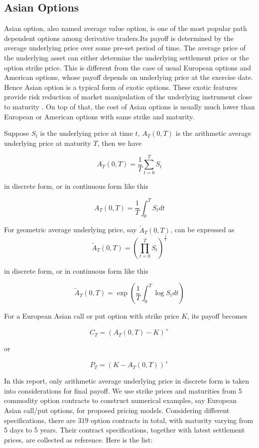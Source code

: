 \documentclass[10pt, a4paper, twocolumn]{article} %
\begin{document}
\subsection{Asian Options}

Asian option, also named average value option, is one of the most popular path dependent options among derivative traders.Its payoff is determined by the average underlying price over some pre-set period of time. The average price of the underlying asset can either determine the underlying settlement price or the option strike price. This is different from the case of usual European options and American options, whose payoff depends on underlying price at the exercise date. Hence Asian option is a typical form of exotic options. These exotic features provide risk reduction of market manipulation of the underlying instrument close to maturity \citep{kemna1990pricing}. On top of that, the cost of Asian options is usually much lower than European or American options with same strike and maturity.

Suppose $S_t$ is the underlying price at time $t$, $A_T(0, T)$ is the arithmetic average underlying price at maturity $T$, then we have

\[ A_T(0,T) = \frac 1T \sum_{t=0}^T S_t \]

in discrete form, or in continuous form like this

\[ A_T(0,T) = \frac 1T \int_0^T S_t dt\]

For geometric average underlying price, say $\tilde{A}_T(0, T)$, can be expressed as
\[ \tilde{A}_T(0, T) = (\prod_{t=0}^T S_t )^{\frac 1T}\]

in discrete form, or in continuous form like this

\[ \tilde{A}_T(0, T) = \exp (\frac 1T \int_0^T \log S_t dt) \]

For a European Asian call or put option with strike price $K$, its payoff becomes

\[ C_T = (A_T(0,T) - K)^+\]

or

\[ P_T = (K - A_T(0,T))^+\]

In this report, only arithmetic average underlying price in discrete form is taken into considerations for final payoff. We use strike prices and maturities from 5 commodity option contracts to construct numerical examples, say European Asian call/put options, for proposed pricing models. Considering different specifications, there are 319 option contracts in total, with maturity varying from 5 days to 5 years. Their contract specifications, together with latest settlement prices, are collected as reference. Here is the list:
\end{document}
